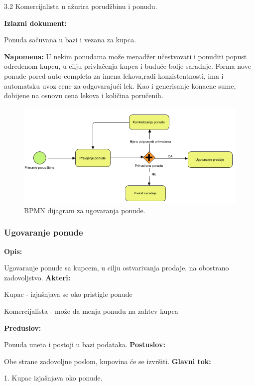 3.2 Komercijalista u ažurira porudžbinu i ponudu.

\textbf{Izlazni dokument:}

Ponuda sačuvana u bazi i vezana za kupca.

\textbf{Napomena:}
U nekim ponudama može menadžer učestvovati i ponuditi popust određenom kupcu, u cilju privlačenja kupca i buduće bolje saradnje.
Forma nove ponude pored auto-completa za imena lekova,radi konzistentnosti, ima i automatsku uvoz cene za odgovarajući lek. Kao i generisanje konacne sume, dobijene na osnovu cena lekova i količina poručenih.

\clearpage

\begin{figure}[ht]
\centering
\includegraphics[width=120mm]{slike/BPMN-pravljenje-ponude.png}%
\caption{BPMN dijagram za ugovaranja ponude.}
\end{figure}

\subsubsection{Ugovaranje ponude}

\textbf{Opis:}

Ugovaranje ponude sa kupcem, u cilju ostvarivanja prodaje, na obostrano zadovoljstvo.
\newline
\textbf{Akteri:}

Kupac - izjašnjava se oko pristigle ponude

Komercijalista - može da menja ponudu na zahtev kupca

\textbf{Preduslov:}

Ponuda uneta i postoji u bazi podataka.
\newline
\textbf{Postuslov:}

Obe strane zadovoljne poslom, kupovina će se izvršiti.
\newline
\textbf{Glavni tok:}

1. Kupac izjašnjava oko ponude.

